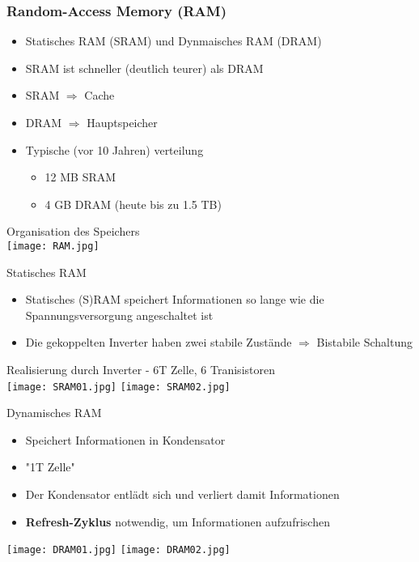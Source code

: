 		\subsubsection{Random-Access Memory (RAM)}
			\begin{itemize}
				\item Statisches RAM (SRAM) und Dynmaisches RAM (DRAM)
				\item SRAM ist schneller (deutlich teurer) als DRAM
				\item SRAM $\Rightarrow$ Cache
				\item DRAM $\Rightarrow$ Hauptspeicher
				\item Typische (vor 10 Jahren) verteilung
					\begin{itemize}
						\item 12 MB SRAM 
						\item 4 GB DRAM (heute bis zu 1.5 TB)
					\end{itemize}
			\end{itemize}
			
			\vspace{0.8cm}
			\begin{center}
				Organisation des Speichers \\
				\texttt{[image: RAM.jpg]} \\
			\end{center}
			\begin{minipage}{0.5\textwidth}
				\centerline{Statisches RAM}
				\begin{itemize}
					\item Statisches (S)RAM speichert Informationen so lange wie die Spannungsversorgung angeschaltet ist
					\item Die gekoppelten Inverter haben zwei stabile Zustände $\Rightarrow$ Bistabile Schaltung
				\end{itemize}
				\begin{center}
					Realisierung durch Inverter - 6T Zelle, 6 Tranisistoren\\
					\texttt{[image: SRAM01.jpg]}
					\texttt{[image: SRAM02.jpg]}
				\end{center}
			\end{minipage}
			\begin{minipage}{0.45\textwidth}
				\centerline{Dynamisches RAM}
				\begin{itemize}
					\item Speichert Informationen in Kondensator
					\item "1T Zelle"
					\item Der Kondensator entlädt sich und verliert damit Informationen
					\item \textbf{Refresh-Zyklus} notwendig, um Informationen aufzufrischen
				\end{itemize}
				\begin{center}
					\texttt{[image: DRAM01.jpg]}
					\texttt{[image: DRAM02.jpg]}
				\end{center}
			\end{minipage}


